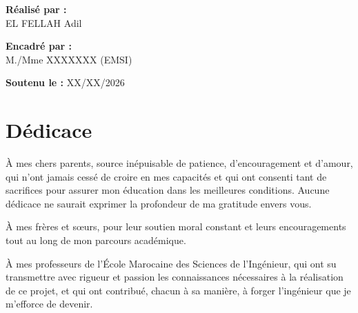 \documentclass[12pt,a4paper]{report}
\begin{document}
\begin{titlepage}
    \vspace{1.5cm}

    \noindent{\color{emsigreen}\rule{0.06cm}{1cm}}\hspace{0.3cm}
    \begin{minipage}{0.8\textwidth}
        \textbf{Réalisé par :}\\
        EL FELLAH Adil
    \end{minipage}

    \vspace{0.5cm}

    \noindent{\color{emsigreen}\rule{0.06cm}{1cm}}\hspace{0.3cm}
    \begin{minipage}{0.8\textwidth}
        \textbf{Encadré par :}\\
        M./Mme XXXXXXX (EMSI)
    \end{minipage}

    \vspace{0.5cm}

    \noindent{\color{emsigreen}\rule{0.06cm}{1cm}}\hspace{0.3cm}
    \begin{minipage}{0.8\textwidth}
        \textbf{Soutenu le :} XX/XX/2026
    \end{minipage}

    \vfill

\end{titlepage}

\setcounter{page}{2}

\chapter*{Dédicace}

À mes chers parents, source inépuisable de patience, d'encouragement et
d'amour, qui n'ont jamais cessé de croire en mes capacités et qui ont
consenti tant de sacrifices pour assurer mon éducation dans les meilleures
conditions. Aucune dédicace ne saurait exprimer la profondeur de ma
gratitude envers vous.

À mes frères et sœurs, pour leur soutien moral constant et leurs
encouragements tout au long de mon parcours académique.

À mes professeurs de l'École Marocaine des Sciences de l'Ingénieur, qui
ont su transmettre avec rigueur et passion les connaissances nécessaires à
la réalisation de ce projet, et qui ont contribué, chacun à sa manière, à
forger l'ingénieur que je m'efforce de devenir.
\end{document}
